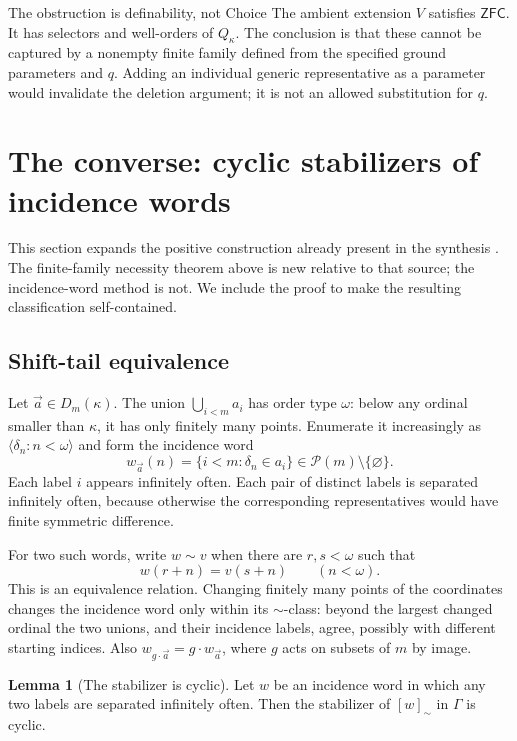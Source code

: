\documentclass[11pt,letterpaper]{article}
\theoremstyle{definition}
\newtheorem{lemma}[definition]{Lemma}
\numberwithin{equation}{section}
\newcommand{\ZFC}{\mathsf{ZFC}}
\newcommand{\powerset}{\mathcal P}
\begin{document}
\begin{assessment}{The obstruction is definability, not Choice}
The ambient extension $V$ satisfies $\ZFC$. It has selectors and well-orders
of $Q_\kappa$. The conclusion is that these cannot be captured by a
nonempty finite family defined from the specified ground parameters and
$q$. Adding an individual generic representative as a parameter would
invalidate the deletion argument; it is not an allowed substitution for
$q$.
\end{assessment}

\section{The converse: cyclic stabilizers of incidence words}\label{sec:sufficiency}

This section expands the positive construction already present in the
synthesis \cite[Section 12.6]{archive}. The finite-family necessity theorem
above is new relative to that source; the incidence-word method is not.
We include the proof to make the resulting classification self-contained.

\subsection{Shift-tail equivalence}

Let $\vec a\in D_m(\kappa)$. The union $\bigcup_{i<m}a_i$ has order type
$\omega$: below any ordinal smaller than $\kappa$, it has only finitely
many points. Enumerate it increasingly as $\langle\delta_n:n<\omega\rangle$
and form the incidence word
\[
 w_{\vec a}(n)=\{i<m:\delta_n\in a_i\}
       \in\powerset(m)\setminus\{\varnothing\}.
\]
Each label $i$ appears infinitely often. Each pair of distinct labels is
separated infinitely often, because otherwise the corresponding
representatives would have finite symmetric difference.

For two such words, write $w\sim v$ when there are $r,s<\omega$ such that
\[
 w(r+n)=v(s+n)\qquad(n<\omega).
\]
This is an equivalence relation. Changing finitely many points of the
coordinates changes the incidence word only within its $\sim$-class:
beyond the largest changed ordinal the two unions, and their incidence
labels, agree, possibly with different starting indices. Also
$w_{g\cdot\vec a}=g\cdot w_{\vec a}$, where $g$ acts on subsets of $m$
by image.

\begin{lemma}[The stabilizer is cyclic]\label{lem:stabilizer}
Let $w$ be an incidence word in which any two labels are separated
infinitely often. Then the stabilizer of $[w]_\sim$ in $\Gamma$ is cyclic.
\end{lemma}
\end{document}
